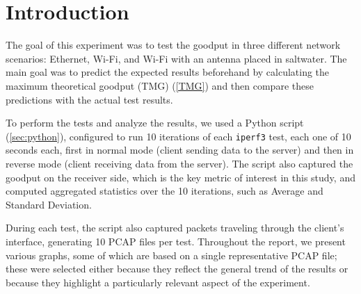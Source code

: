 \section{Introduction}
\label{sec:intro}
The goal of this experiment was to test the goodput in three different network scenarios: Ethernet, Wi-Fi, and Wi-Fi with an antenna placed in saltwater. The main goal was to predict the expected results beforehand by calculating the maximum theoretical goodput (TMG) (\ref{TMG}) and then compare these predictions with the actual test results.

To perform the tests and analyze the results, we used a Python script (\ref{sec:python}), configured to run 10 iterations of each \texttt{iperf3} test, each one of 10 seconds each, first in normal mode (client sending data to the server) and then in reverse mode (client receiving data from the server). The script also captured the goodput on the receiver side, which is the key metric of interest in this study, and computed aggregated statistics over the 10 iterations, such as Average and Standard Deviation.

During each test, the script also captured packets traveling through the client's interface, generating 10 PCAP files per test. Throughout the report, we present various graphs, some of which are based on a single representative PCAP file; these were selected either because they reflect the general trend of the results or because they highlight a particularly relevant aspect of the experiment.